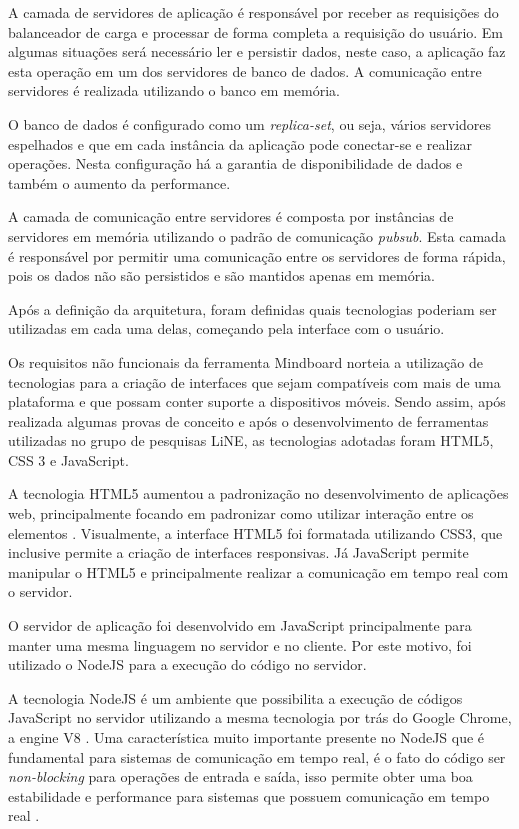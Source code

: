 A camada de servidores de aplicação é responsável por receber as requisições do balanceador de carga e processar de forma completa a requisição do usuário. Em algumas situações será necessário ler e persistir dados, neste caso, a aplicação faz esta operação em um dos servidores de banco de dados. A comunicação entre servidores é realizada utilizando o banco em memória.

O banco de dados é configurado como um \emph{replica-set}, ou seja, vários servidores espelhados e que em cada instância da aplicação pode conectar-se e realizar operações. Nesta configuração há a garantia de disponibilidade de dados e também o aumento da performance.

A camada de comunicação entre servidores é composta por instâncias de servidores em memória utilizando o padrão de comunicação \emph{pubsub}. Esta camada é responsável por permitir uma comunicação entre os servidores de forma rápida, pois os dados não são persistidos e são mantidos apenas em memória.

Após a definição da arquitetura, foram definidas quais tecnologias poderiam ser utilizadas em cada uma delas, começando pela interface com o usuário. 

Os requisitos não funcionais da ferramenta Mindboard norteia a utilização de tecnologias para a criação de interfaces que sejam compatíveis com mais de uma plataforma e que possam conter suporte a dispositivos móveis. Sendo assim, após realizada algumas provas de conceito e após o desenvolvimento de ferramentas utilizadas no grupo de pesquisas LiNE, as tecnologias adotadas foram HTML5, CSS 3 e JavaScript.

A tecnologia HTML5 aumentou a padronização no desenvolvimento de aplicações web, principalmente focando em padronizar como utilizar interação entre os elementos \cite{html5}. Visualmente, a interface HTML5 foi formatada utilizando CSS3, que inclusive permite a criação de interfaces responsivas. Já JavaScript permite manipular o HTML5 e principalmente realizar a comunicação em tempo real com o servidor.

O servidor de aplicação foi desenvolvido em JavaScript principalmente para manter uma mesma linguagem no servidor e no cliente. Por este motivo, foi utilizado o NodeJS para a execução do código no servidor.

A tecnologia NodeJS é um ambiente que possibilita a execução de códigos JavaScript no servidor utilizando a mesma tecnologia por trás do Google Chrome, a engine V8 \cite{nodejs}. Uma característica muito importante presente no NodeJS que é fundamental para sistemas de comunicação em tempo real, é o fato do código ser \emph{non-blocking} para operações de entrada e saída, isso permite obter uma boa estabilidade e performance para sistemas que possuem comunicação em tempo real \cite{nodejs}.

